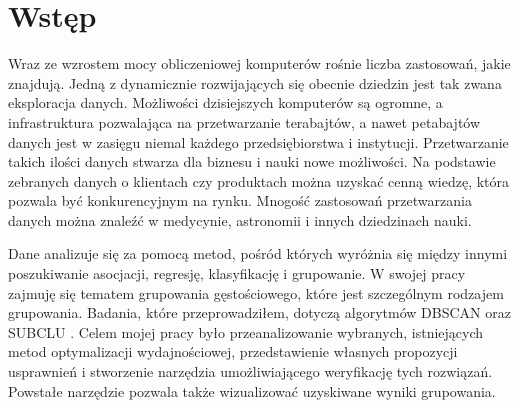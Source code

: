 \chapter{Wstęp}
Wraz ze wzrostem mocy obliczeniowej komputerów rośnie liczba zastosowań, jakie znajdują. Jedną z dynamicznie rozwijających się obecnie dziedzin jest tak zwana eksploracja danych. Możliwości dzisiejszych komputerów są ogromne, a infrastruktura pozwalająca na przetwarzanie terabajtów, a nawet petabajtów danych jest w zasięgu niemal każdego przedsiębiorstwa i instytucji. Przetwarzanie takich ilości danych stwarza dla biznesu i nauki nowe możliwości. Na podstawie zebranych danych o klientach czy produktach można uzyskać cenną wiedzę, która pozwala być konkurencyjnym na rynku. Mnogość zastosowań przetwarzania danych można znaleźć w medycynie, astronomii i innych dziedzinach nauki. \par
Dane analizuje się za pomocą metod, pośród których wyróżnia się między innymi poszukiwanie asocjacji, regresję, klasyfikację i grupowanie. W swojej pracy zajmuję się tematem grupowania gęstościowego, które jest szczególnym rodzajem grupowania. Badania, które przeprowadziłem, dotyczą algorytmów DBSCAN \cite{dbscan} oraz SUBCLU \cite{subclu}. Celem mojej pracy było przeanalizowanie wybranych, istniejących metod optymalizacji wydajnościowej, przedstawienie własnych propozycji usprawnień i stworzenie narzędzia umożliwiającego weryfikację tych rozwiązań. Powstałe narzędzie pozwala także wizualizować uzyskiwane wyniki grupowania. \par